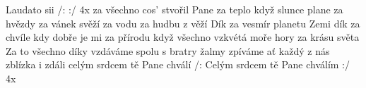 \begin{TEXT}{Laudato sii}
\REFREN  /:  :/ 4x 
\SLOKA {} za všechno cos' stvořil Pane \NL
{} za teplo když slunce plane \NL
{} za hvězdy za vánek svěží \NL
{} za vodu za hudbu z věží 
\SLOKA Dík za vesmír planetu Zemi \NL
dík za chvíle kdy dobře je mi \NL
za přírodu když všechno vzkvétá \NL
moře hory za krásu světa 
\SLOKA Za to všechno díky vzdáváme \NL
spolu s bratry žalmy zpíváme \NL
ať každý z nás zblízka i zdáli \NL
celým srdcem tě Pane chválí
\SLOKA[] /: Celým srdcem tě Pane chválím :/ 4x
\end{TEXT}

